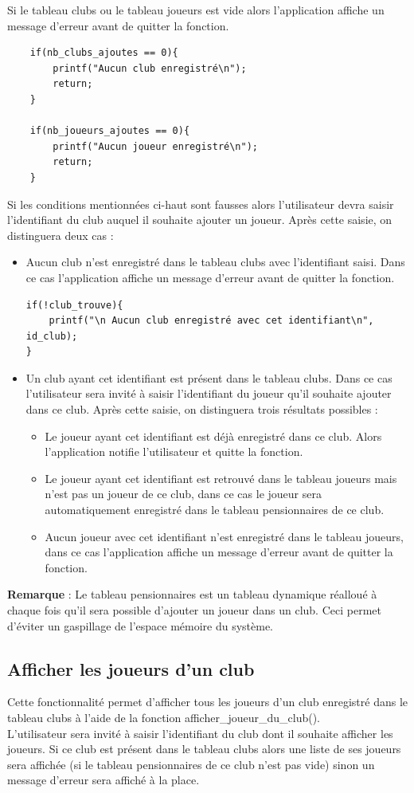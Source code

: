 \documentclass[12pt,a4paper]{report}
\begin{document}
Si le tableau clubs ou le tableau joueurs est vide alors l'application affiche un message d'erreur avant de quitter la fonction. 
\begin{lstlisting}
	if(nb_clubs_ajoutes == 0){
		printf("Aucun club enregistré\n"); 
		return;       
	}
	
	if(nb_joueurs_ajoutes == 0){
		printf("Aucun joueur enregistré\n");
		return;
	}
\end{lstlisting}
Si les conditions mentionnées ci-haut sont fausses alors l'utilisateur devra saisir l'identifiant du club auquel il souhaite ajouter un joueur. Après cette saisie, on distinguera deux cas :
\begin{itemize}
	\item Aucun club n'est enregistré dans le tableau clubs avec l'identifiant saisi. Dans ce cas l'application affiche un message d'erreur avant de quitter la fonction.
	\begin{lstlisting}
if(!club_trouve){
	printf("\n Aucun club enregistré avec cet identifiant\n", id_club);
}
	\end{lstlisting}
	\item Un club ayant cet identifiant est présent dans le tableau clubs. Dans ce cas l'utilisateur sera invité à saisir l'identifiant du joueur qu'il souhaite ajouter dans ce club. Après cette saisie, on distinguera trois résultats possibles :
	\begin{itemize}
		\item Le joueur ayant cet identifiant est déjà enregistré dans ce club. Alors l'application notifie l'utilisateur et quitte la fonction.
		\item Le joueur ayant cet identifiant est retrouvé dans le tableau joueurs mais n'est pas un joueur de ce club, dans ce cas le joueur sera automatiquement enregistré dans le tableau pensionnaires de ce club.
		\item Aucun joueur avec cet identifiant n'est enregistré dans le tableau joueurs, dans ce cas l'application affiche un message d'erreur avant de quitter la fonction. 
	\end{itemize}
\end{itemize}
\textbf{Remarque} : Le tableau pensionnaires est un tableau dynamique réalloué à chaque fois qu'il sera possible d'ajouter un joueur dans un club. Ceci permet d'éviter un gaspillage de l'espace mémoire du système.

\subsection{Afficher les joueurs d'un club}
Cette fonctionnalité permet d'afficher tous les joueurs d'un club enregistré dans le tableau clubs à l'aide de la fonction afficher\_joueur\_du\_club().\\
L'utilisateur sera invité à saisir l'identifiant du club dont il souhaite afficher les joueurs. Si ce club est présent dans le tableau clubs alors une liste de ses joueurs sera affichée (si le tableau pensionnaires de ce club n'est pas vide) sinon un message d'erreur sera affiché à la place.
\end{document}
